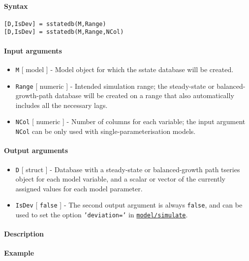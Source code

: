 


	\paragraph{Syntax}

\begin{verbatim}
[D,IsDev] = sstatedb(M,Range)
[D,IsDev] = sstatedb(M,Range,NCol)
\end{verbatim}

\paragraph{Input arguments}

\begin{itemize}
\item
  \texttt{M} {[} model {]} - Model object for which the sstate database
  will be created.
\item
  \texttt{Range} {[} numeric {]} - Intended simulation range; the
  steady-state or balanced-growth-path database will be created on a
  range that also automatically includes all the necessary lags.
\item
  \texttt{NCol} {[} numeric {]} - Number of columns for each variable;
  the input argument \texttt{NCol} can be only used with
  single-parameterisation models.
\end{itemize}

\paragraph{Output arguments}

\begin{itemize}
\item
  \texttt{D} {[} struct {]} - Database with a steady-state or
  balanced-growth path tseries object for each model variable, and a
  scalar or vector of the currently assigned values for each model
  parameter.
\item
  \texttt{IsDev} {[} \texttt{false} {]} - The second output argument is
  always \texttt{false}, and can be used to set the option
  \texttt{'deviation='} in
  \href{model/simulate}{\texttt{model/simulate}}.
\end{itemize}

\paragraph{Description}

\paragraph{Example}


